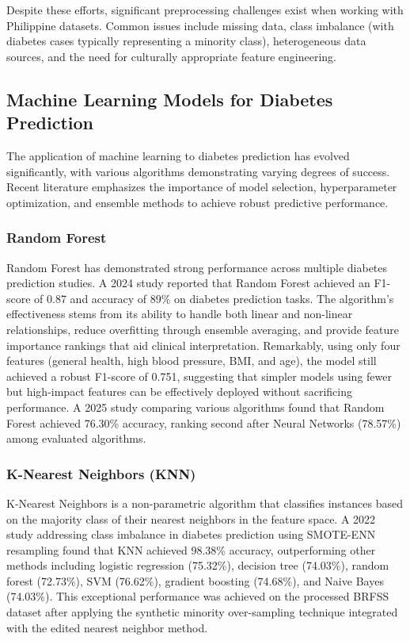 Despite these efforts, significant preprocessing challenges exist when working with Philippine datasets. Common issues include missing data, class imbalance (with diabetes cases typically representing a minority class), heterogeneous data sources, and the need for culturally appropriate feature engineering.

\subsection{Machine Learning Models for Diabetes Prediction}

The application of machine learning to diabetes prediction has evolved significantly, with various algorithms demonstrating varying degrees of success. Recent literature emphasizes the importance of model selection, hyperparameter optimization, and ensemble methods to achieve robust predictive performance.

\subsubsection{Random Forest}

Random Forest has demonstrated strong performance across multiple diabetes prediction studies. A 2024 study reported that Random Forest achieved an F1-score of 0.87 and accuracy of 89\% on diabetes prediction tasks. The algorithm's effectiveness stems from its ability to handle both linear and non-linear relationships, reduce overfitting through ensemble averaging, and provide feature importance rankings that aid clinical interpretation. Remarkably, using only four features (general health, high blood pressure, BMI, and age), the model still achieved a robust F1-score of 0.751, suggesting that simpler models using fewer but high-impact features can be effectively deployed without sacrificing performance. A 2025 study comparing various algorithms found that Random Forest achieved 76.30\% accuracy, ranking second after Neural Networks (78.57\%) among evaluated algorithms.

\subsubsection{K-Nearest Neighbors (KNN)}

K-Nearest Neighbors is a non-parametric algorithm that classifies instances based on the majority class of their nearest neighbors in the feature space. A 2022 study addressing class imbalance in diabetes prediction using SMOTE-ENN resampling found that KNN achieved 98.38\% accuracy, outperforming other methods including logistic regression (75.32\%), decision tree (74.03\%), random forest (72.73\%), SVM (76.62\%), gradient boosting (74.68\%), and Naive Bayes (74.03\%). This exceptional performance was achieved on the processed BRFSS dataset after applying the synthetic minority over-sampling technique integrated with the edited nearest neighbor method.

